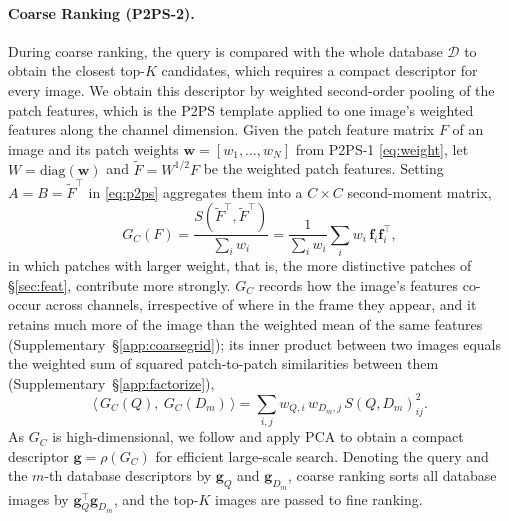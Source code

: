 \paragraph{Coarse Ranking (P2PS-2).}
\label{sec:global}
During coarse ranking, the query is compared with the whole database $\mathcal D$ to obtain the closest top-$K$ candidates, which requires a compact descriptor for every image. We obtain this descriptor by weighted second-order pooling of the patch features, which is the P2PS template applied to one image's weighted features along the channel dimension. Given the patch feature matrix $F$ of an image and its patch weights $\mathbf w=[w_1,\dots,w_N]$ from P2PS-1 \eqref{eq:weight}, let $W=\mathrm{diag}(\mathbf w)$ and $\tilde F=W^{1/2}F$ be the weighted patch features. Setting $A=B=\tilde F^{\top}$ in \eqref{eq:p2ps} aggregates them into a $C\times C$ second-moment matrix,
\begin{equation}\label{eq:gc}
  G_C(F)=\frac{S(\tilde F^{\top},\tilde F^{\top})}{\sum_i w_i}=\frac{1}{\sum_i w_i}\sum_i w_i\,\mathbf f_i\mathbf f_i^{\top},
\end{equation}
in which patches with larger weight, that is, the more distinctive patches of \S\ref{sec:feat}, contribute more strongly. $G_C$ records how the image's features co-occur across channels, irrespective of where in the frame they appear, and it retains much more of the image than the weighted mean of the same features (Supplementary~\S\ref{app:coarsegrid}); its inner product between two images equals the weighted sum of squared patch-to-patch similarities between them (Supplementary~\S\ref{app:factorize}),
\begin{equation}\label{eq:so-deriv}
  \big\langle\, G_C(Q),\ G_C(D_m)\,\big\rangle
  =\sum_{i,j} w_{Q,i}\,w_{D_m,j}\,S(Q,D_m)_{ij}^{2}.
\end{equation}
As $G_C$ is high-dimensional, we follow \citep{bcnn,mpncov} and apply PCA to obtain a compact descriptor $\mathbf g=\rho(G_C)$ for efficient large-scale search.  %
Denoting the query and the $m$-th database descriptors by $\mathbf g_Q$ and $\mathbf g_{D_m}$, coarse ranking sorts all database images by $\mathbf g_Q^{\top}\mathbf g_{D_m}$, and the top-$K$ images are passed to fine ranking.

